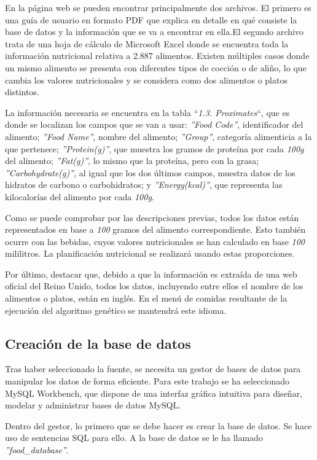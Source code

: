 En la página web se pueden encontrar principalmente dos archivos. El primero es una guía de usuario en formato PDF que explica en detalle en qué consiste la base de datos y la información que se va a encontrar en ella.\newpage El segundo archivo trata de una hoja de cálculo de Microsoft Excel donde se encuentra toda la información nutricional relativa a 2.887 alimentos. Existen múltiples casos donde un mismo alimento se presenta con diferentes tipos de cocción o de aliño, lo que cambia los valores nutricionales y se considera como dos alimentos o platos distintos.

La información necesaria se encuentra en la tabla ``\textit{1.3. Proximates}``, que es donde se localizan los campos que se van a usar: \textit{''Food Code''}, identificador del alimento; \textit{''Food Name''}, nombre del alimento; \textit{''Group''}, categoría alimenticia a la que pertenece; \textit{''Protein(g)''}, que muestra los gramos de proteína por cada \textit{100g} del alimento; \textit{''Fat(g)''}, lo mismo que la proteína, pero con la grasa; \textit{''Carbohydrate(g)''}, al igual que los dos últimos campos, muestra datos de los hidratos de carbono o carbohidratos; y \textit{''Energy(kcal)''}, que representa las kilocalorías del alimento por cada \textit{100g}.

Como se puede comprobar por las descripciones previas, todos los datos están representados en base a \textit{100} gramos del alimento correspondiente. Esto también ocurre con las bebidas, cuyos valores nutricionales se han calculado en base \textit{100} mililitros. La planificación nutricional se realizará usando estas proporciones.

Por último, destacar que, debido a que la información es extraída de una web oficial del Reino Unido, todos los datos, incluyendo entre ellos el nombre de los alimentos o platos, están en inglés. En el menú de comidas resultante de la ejecución del algoritmo genético se mantendrá este idioma.

\subsection{Creación de la base de datos}
Tras haber seleccionado la fuente, se necesita un gestor de bases de datos para manipular los datos de forma eficiente. Para este trabajo se ha seleccionado MySQL Workbench, que dispone de una interfaz gráfica intuitiva para diseñar, modelar y administrar bases de datos MySQL.~\cite{mysqlworkbench}

Dentro del gestor, lo primero que se debe hacer es crear la base de datos. Se hace uso de sentencias SQL para ello. A la base de datos se le ha llamado \textit{''food\_database''}.

